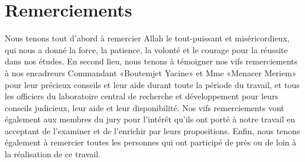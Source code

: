 \chapter*{Remerciements}

Nous tenons tout d’abord à remercier Allah le tout-puissant et miséricordieux, qui nous a donné la force, la patience, la volonté et le courage pour la réussite dans nos études. En second lieu, nous tenons à témoigner nos vifs remerciements à nos encadreurs Commandant «Boutemjet Yacine» et Mme «Menacer Meriem»  pour leur précieux conseils et leur aide durant toute la période du travail, et tous les officiers du laboratoire central de recherche et développement
pour leurs conseils judicieux, leur aide et leur disponibilité. Nos vifs remerciements vont également aux membres du jury pour l’intérêt qu’ils ont porté à notre travail en acceptant de l’examiner et de l’enrichir par leurs propositions. Enfin, nous tenons également à remercier toutes les personnes qui ont participé de près ou de loin à la réalisation de ce travail.





